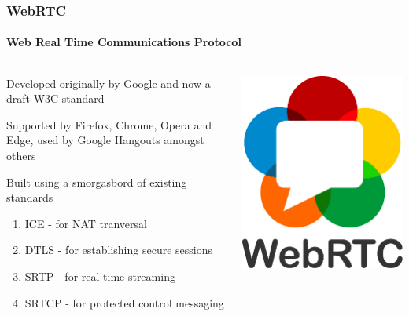 \documentclass[handout, notes=show]{beamer}
\begin{document}
\begin{frame}
\frametitle{WebRTC}
\framesubtitle{Web Real Time Communications Protocol}

\begin{columns}[T]
\begin{column}[T]{0.7\textwidth}
\setlength{\parskip}{0.5em}

Developed originally by Google and now a draft W3C standard

Supported by Firefox, Chrome, Opera and Edge, used by Google Hangouts amongst others

Built using a smorgasbord of existing standards

\begin{enumerate}
\item ICE - for NAT tranversal
\item DTLS - for establishing secure sessions
\item SRTP - for real-time streaming
\item SRTCP - for protected control messaging
\end{enumerate}

\end{column}
\begin{column}[T]{0.3\textwidth}
\vspace{2.5em}
\includegraphics[width=1.0\textwidth]{webrtc-logo-vert-retro-dist}
\end{column}
\end{columns}

\end{frame}
\end{document}
